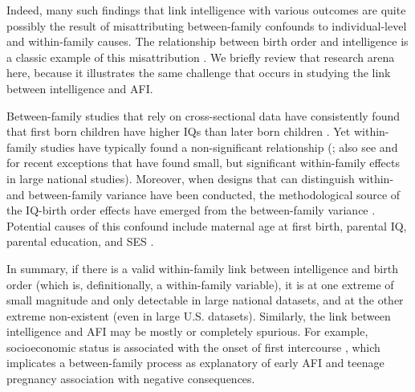 \documentclass[a4paper,man,apacite,natbib,12pt,longtable]{apa6}\usepackage[]{graphicx}\usepackage[]{color}
\begin{document}
Indeed, many such findings that link intelligence with various outcomes are quite possibly the result of misattributing between-family confounds to individual-level and within-family causes. The relationship between birth order and intelligence is a classic example of this misattribution \citep[See][]{damian2015associations,Rodgers2000,rodgers2014birth}. We briefly review that research arena here, because it illustrates the same challenge that occurs in studying the link between intelligence and AFI. 

Between-family studies that rely on cross-sectional data have consistently found that first born children have higher IQs than later born children \citep{belmont1973birth,zajonc1976family}. Yet within-family studies have typically found a non-significant relationship (\citealp{berbaum1980intellectual,galbraith1982sibling,retherford1991birth,rodgers1984confluence,Rodgers2000}; also see \citealp{barclay2015within} and \citealp{bjerkedal2007intelligence} for recent exceptions that have found small, but significant within-family effects in large national studies). Moreover, when designs that can distinguish within- and between-family variance have been conducted, the methodological source of the IQ-birth order effects have emerged from the between-family variance \citep{black2011older,rodgers1984confluence,Rodgers2000,Wichman2006,Wichman2007}. Potential causes of this confound include maternal age at first birth, parental IQ, parental education, and SES \citep[][also see \citet{Anastasi1956} for an insightful overview, written prior to the IQ-birth order debate]{page1979family,Rodgers2001admixture,Rodgers2008AJS}.

In summary, if there is a valid within-family link between intelligence and birth order (which is, definitionally, a within-family variable), it is at one extreme of small magnitude and only detectable in large national datasets, and at the other extreme non-existent (even in large U.S. datasets). Similarly, the link between intelligence and AFI may be mostly or completely spurious. For example, socioeconomic status is associated with the onset of first intercourse \citep{Lammers2000}, which implicates a between-family process as explanatory of early AFI and teenage pregnancy association with negative consequences.
\end{document}
